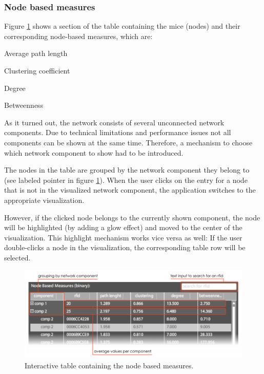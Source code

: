 \subsubsection*{Node based measures}

Figure \ref{fig:node_based_measures} shows a section of the table containing the mice (nodes) and their corresponding node-based measures, which are:

\begin{mylist}
\item Average path length
\item Clustering coefficient
\item Degree
\item Betweenness
\end{mylist}

As it turned out, the network consists of several unconnected network components. Due to technical limitations and performance issues not all components can be shown at the same time. Therefore, a mechanism to choose which network component to show had to be introduced.

The nodes in the table are grouped by the network component they belong to (see labeled pointer in figure \ref{fig:node_based_measures}). When the user clicks on the entry for a node that is not in the visualized network component, the application switches to the appropriate visualization.

However, if the clicked node belongs to the currently shown component, the node will be highlighted (by adding a glow effect) and moved to the center of the visualization. This highlight mechanism works vice versa as well: If the user double-clicks a node in the visualization, the corresponding table row will be selected.

\begin{figure}[!htpb]
\begin{center}
  \includegraphics[width=\textwidth]{assets/pdf/node_based_measures.pdf}
  \caption[Table containing the node based measures]{Interactive table containing the node based measures.}
  \label{fig:node_based_measures}
\end{center}
\end{figure}

